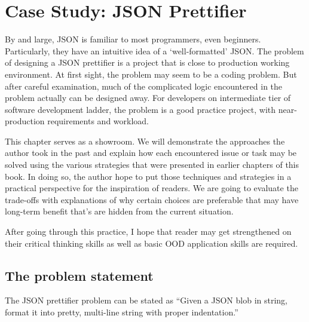 
\chapter{Case Study: JSON Prettifier}\label{ch:json-prettifier}

By and large, JSON is familiar to most programmers, even beginners.
Particularly, they have an intuitive idea of a `well-formatted' JSON\@.
The problem of designing a JSON prettifier is a project that is close to production working
environment.
At first sight, the problem may seem to be a coding problem.
But after careful examination, much of the complicated logic encountered in
the problem actually can be designed away.
For developers on intermediate tier of software development ladder,
the problem is a good practice project, with near-production requirements and workload.

This chapter serves as a showroom.
We will demonstrate the approaches the author took in the past and
explain how each encountered issue or task may be solved using the various strategies that were
presented in earlier chapters of this book.
In doing so, the author hope to put those techniques and strategies in a practical perspective
for the inspiration of readers.
We are going to evaluate the trade-offs with explanations of why certain choices are preferable
that may have long-term benefit that's are hidden from the current situation.

After going through this practice, I hope that reader may get strengthened on their critical
thinking skills as well as basic OOD application skills are required.

\section{The problem statement}\label{sec:theProblemStatement.Json}

The JSON prettifier problem can be stated as ``Given a JSON blob in string, format
it into pretty, multi-line string with proper indentation.''

